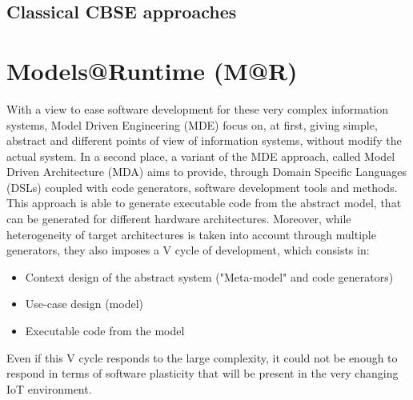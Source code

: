 \subsection{Classical CBSE approaches}





\section{Models@Runtime (M@R)}
With a view to ease software development for these very complex information systems, Model Driven Engineering (MDE) focus on, at first, giving simple, abstract and different points of view of information systems, without modify the actual system. 
In a second place, a variant of the MDE approach, called Model Driven Architecture (MDA)\cite{kleppe2003mda} aims to provide, through Domain Specific Languages (DSLs) coupled with code generators, software development tools and methods.
This approach is able to generate executable code from the abstract model, that can be generated for different hardware architectures.
Moreover, while heterogeneity of target architectures is taken into account through multiple generators, they also imposes a V cycle of development\cite{fouquet2013kevoree}, which consists in:
\begin{itemize}
	\item Context design of the abstract system ("Meta-model" and code generators)
	\item Use-case design (model)
	\item Executable code from the model
\end{itemize}
Even if this V cycle responds to the large complexity, it could not be enough to respond in terms of software plasticity that will be present in the very changing IoT environment.

